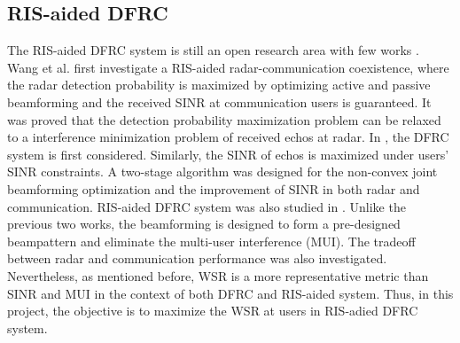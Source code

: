\subsection{RIS-aided DFRC}
The RIS-aided DFRC system is still an open research area with few works \cite{wang2020ris, jiang2021dfrc,wang2021joint}.
Wang et al. \cite{wang2020ris} first investigate a RIS-aided radar-communication coexistence, where the radar detection probability
is maximized by optimizing active and passive beamforming and the received SINR at communication users is guaranteed.
It was proved that the detection probability maximization problem can be relaxed to a interference minimization problem of received echos at radar. 
In \cite{jiang2021dfrc}, the DFRC system is first considered. Similarly, the SINR of echos is maximized under users' SINR constraints.
A two-stage algorithm was designed for the non-convex joint beamforming optimization and the improvement of 
SINR in both radar and communication. RIS-aided DFRC system was also studied in \cite{wang2021joint}.
Unlike the previous two works, the beamforming is designed to form a pre-designed beampattern and eliminate the multi-user interference (MUI).
The tradeoff between radar and communication performance was also investigated. Nevertheless, as mentioned before, WSR is a more representative metric than SINR and MUI
in the context of both DFRC and RIS-aided system. Thus, in this project, the objective is to maximize the WSR at users in RIS-adied DFRC system.

